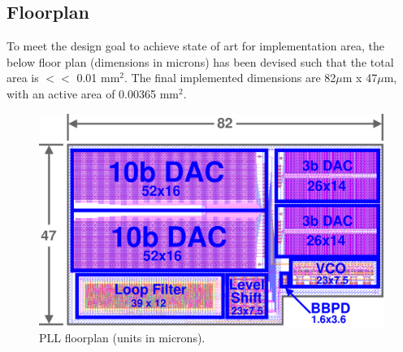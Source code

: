 	

	\subsection{Floorplan}
	To meet the design goal to achieve state of art for implementation area, the below floor plan (dimensions in microns) has been devised such that the total area is $<<$ 0.01 mm$^2$. The final implemented dimensions are 82$\mu$m x 47$\mu$m, with an active area of 0.00365 mm$^2$.
		\begin{figure}[htb!]
	        \centering
	        \includegraphics[width=1\textwidth, angle=0]{./figs/design/final_floorplan}
		    \caption{PLL floorplan (units in microns).}
		\end{figure}

